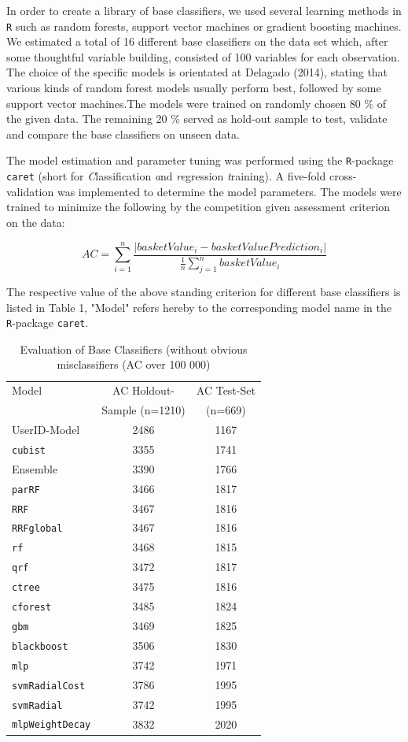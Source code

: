 In order to create a library of base classifiers, we used several learning methods in \texttt{R} such as random forests, support vector machines or gradient boosting machines. We estimated a total of 16 different base classifiers on the data set which, after some thoughtful variable building, consisted of 100 variables for each observation. The choice of the specific models is orientated at Delagado (2014), stating that various kinds of random forest models usually perform best, followed by some support vector machines.\cite{Fernandez-Delgado2014}The models were trained on randomly chosen 80 \% of the given data. The remaining 20 \% served as hold-out sample to test, validate and compare the base classifiers on unseen data.

The model estimation and parameter tuning was performed using the \texttt{R}-package \texttt{caret} (short for \textit{C}lassification \textit{a}nd \textit{re}gression \textit{t}raining). A five-fold cross-validation was implemented to determine the model parameters. The models were trained to minimize the following by the competition given assessment criterion on the data:

\[AC = \sum_{i=1}^n \frac{|basketValue_{i} - basketValuePrediction_{i}|}{\frac{1}{n} \sum_{j=1}^n basketValue_{i}}\]

The respective value of the above standing criterion for different base classifiers is listed in Table 1, "Model" refers hereby to the corresponding model name in the \texttt{R}-package \texttt{caret}.

\begin{table}
\centering
\begin{tabular}{l|cc}
\hline
\hline
Model & AC Holdout- &AC Test-Set \\
& Sample (n=1210)  &  (n=669) \\\hline
UserID-Model & 2486 & 1167 \\
\texttt{cubist} & 3355 & 1741\\
Ensemble & 3390 & 1766 \\
\texttt{parRF} & 3466 & 1817 \\
\texttt{RRF} & 3467 & 1816\\
\texttt{RRFglobal} & 3467 & 1816\\
\texttt{rf} & 3468 & 1815\\
\texttt{qrf} & 3472 & 1817\\
\texttt{ctree} & 3475 & 1816\\
\texttt{cforest} & 3485 & 1824\\
\texttt{gbm }& 3469 & 1825\\
\texttt{blackboost} & 3506 & 1830\\
\texttt{mlp} & 3742 & 1971\\
\texttt{svmRadialCost} & 3786 & 1995\\
\texttt{svmRadial} & 3742 & 1995\\
\texttt{mlpWeightDecay} & 3832 & 2020\\
\hline
\hline
\end{tabular}
\caption{Evaluation of Base Classifiers (without obvious misclassifiers (AC over 100 000)}
\end{table}

